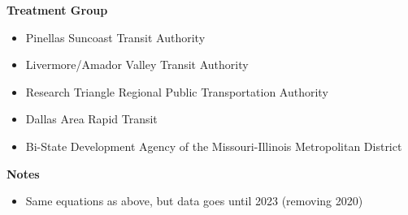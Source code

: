 \documentclass [11pt]{article}
\begin{document}
\textbf{Treatment Group}
\begin{itemize}
    \item Pinellas Suncoast Transit Authority
    \item Livermore/Amador Valley Transit Authority
    \item Research Triangle Regional Public Transportation Authority
    \item Dallas Area Rapid Transit 
    \item Bi-State Development Agency of the Missouri-Illinois Metropolitan District
\end{itemize}

\textbf{Notes}

\begin{itemize}
    \item Same equations as above, but data goes until 2023 (removing 2020)
\end{itemize}
\end{document}
